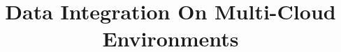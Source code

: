 \documentclass{vldb}
\begin{document}
 

\title{Data Integration On Multi-Cloud Environments}



%
%
%
%

\end{document}
